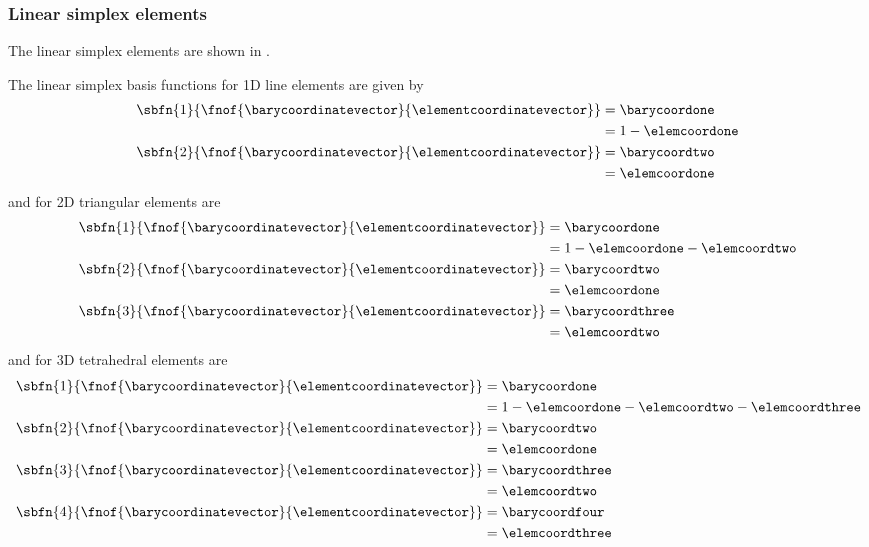 \subsubsection{Linear simplex elements}
\label{subsubsec:BasisFunctionsSimplexLinear}

The linear simplex elements are shown in .


The linear simplex basis functions for 1D line elements are given by
\begin{equation}
\begin{aligned}
  \sbfn{1}{\fnof{\barycoordinatevector}{\elementcoordinatevector}}&=\barycoordone\\
  &=1-\elemcoordone\\
  \sbfn{2}{\fnof{\barycoordinatevector}{\elementcoordinatevector}}&=\barycoordtwo\\
  &=\elemcoordone
\end{aligned}
\label{eqn:OneDLinearSimplexBasisFunctions}
\end{equation}
and for 2D triangular elements are
\begin{equation}
\begin{aligned}
  \sbfn{1}{\fnof{\barycoordinatevector}{\elementcoordinatevector}}&=\barycoordone\\
  &=1-\elemcoordone-\elemcoordtwo\\
  \sbfn{2}{\fnof{\barycoordinatevector}{\elementcoordinatevector}}&=\barycoordtwo\\
  &=\elemcoordone\\
  \sbfn{3}{\fnof{\barycoordinatevector}{\elementcoordinatevector}}&=\barycoordthree\\
  &=\elemcoordtwo
\end{aligned}
\label{eqn:TwoDLinearSimplexBasisFunctions}
\end{equation}
and for 3D tetrahedral elements are
\begin{equation}
\begin{aligned}
  \sbfn{1}{\fnof{\barycoordinatevector}{\elementcoordinatevector}}&=\barycoordone\\
  &=1-\elemcoordone-\elemcoordtwo-\elemcoordthree\\
  \sbfn{2}{\fnof{\barycoordinatevector}{\elementcoordinatevector}}&=\barycoordtwo\\
  &=\elemcoordone\\
  \sbfn{3}{\fnof{\barycoordinatevector}{\elementcoordinatevector}}&=\barycoordthree\\
  &=\elemcoordtwo\\
  \sbfn{4}{\fnof{\barycoordinatevector}{\elementcoordinatevector}}&=\barycoordfour\\
  &=\elemcoordthree
\end{aligned}
\label{eqn:ThreeDLinearSimplexBasisFunctions}
\end{equation}


